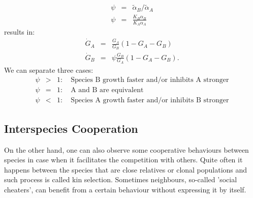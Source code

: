 \documentclass[10pt,A4paper]{article}
\begin{document}
\begin{eqnarray}
\psi&=&\tilde{\alpha}_B/\tilde{\alpha}_A\\
\psi&=&\frac{K_B\alpha_B}{K_A\alpha_A}
\end{eqnarray}
results in: 
\begin{eqnarray}
\dot{G}_A &=&\frac{G_A}{G_B}\left(1 - G_A-G_B\right )\\
\dot{G}_B &=&\psi\frac{G_B}{G_A}\left(1-G_A-G_B\right ). 
\end{eqnarray}
We can separate three cases: 
\begin{eqnarray}
\psi&>&1:\quad\text{Species B growth faster and/or inhibits A stronger}\\
\psi&=&1:\quad\text{A and B are equivalent}\\
\psi&<&1:\quad\text{Species A growth faster and/or inhibits B stronger}
\end{eqnarray}

\subsection{Interspecies Cooperation}

On the other hand, one can also observe some cooperative behaviours between species in case when it facilitates the competition with others.
Quite often it happens between the species that are close relatives or clonal populations and such process is called kin selection. 
Sometimes neighbours, so-called 'social cheaters', can benefit from a certain behaviour without expressing it by itself.  

\end{document}
